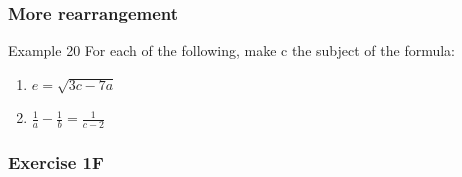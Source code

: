 \documentclass{beamer}
\begin{document}
\begin{frame}
    \frametitle{More rearrangement}
    \begin{block}{Example 20}
        For each of the following, make c the subject of the formula:\\
        \begin{enumerate}
            \item $e = \sqrt{3c-7a}$
            \item $\frac{1}{a} - \frac{1}{b} = \frac{1}{c-2}$
        \end{enumerate}
    \end{block}
\end{frame}

\begin{frame}
    \frametitle{Exercise 1F}
\end{frame}
\end{document}
